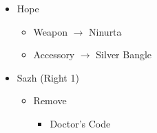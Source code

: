 \begin{paracol}{2}
\begin{menu}
		\begin{itemize}
			\equip
			\begin{itemize}
				\item Hope
				      \begin{itemize}
					      \item Weapon $\rightarrow$ Ninurta
					      \item Accessory $\rightarrow$ Silver Bangle
				      \end{itemize}
				\item Sazh (Right 1)
				      \begin{itemize}
					      \item Remove
					            \begin{itemize}
						            \item Doctor's Code
					            \end{itemize}
				      \end{itemize}
			\end{itemize}
		\end{itemize}
	\end{menu}



\end{paracol}
